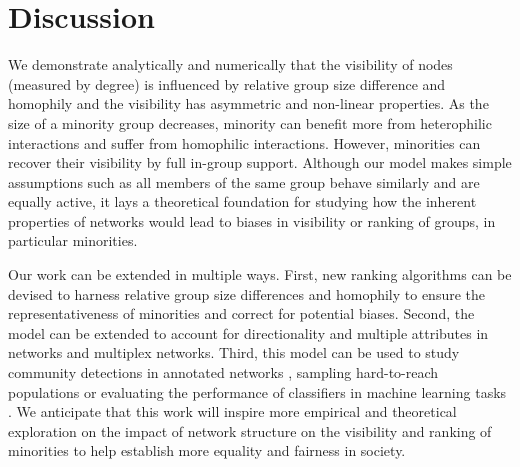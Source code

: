 \section{Discussion}



We demonstrate analytically and numerically that the visibility of nodes (measured by degree) is influenced by relative group size difference and homophily and the visibility has asymmetric and non-linear properties. As the size of a minority group decreases, minority can benefit more from heterophilic interactions and suffer from homophilic interactions. However, minorities can recover their visibility by full in-group support. Although our model makes simple assumptions such as all members of the same group behave similarly and are equally active, it lays a theoretical foundation for studying how the inherent properties of networks would lead to biases in visibility or ranking of groups, in particular minorities. %

Our work can be extended in multiple ways. First, new ranking algorithms can be devised to harness relative group size differences and homophily to ensure the representativeness of minorities and correct for potential biases. Second, the model can be extended to account for directionality and multiple attributes in networks and multiplex networks. Third, this model can be used to study community detections in annotated networks \cite{newman2016structure}, sampling hard-to-reach populations \cite{shaghaghi2011approaches} or evaluating the performance of classifiers in machine learning tasks \cite{hardt2016equality,dwork2012fairness}. We anticipate that this work will inspire more empirical and theoretical exploration on the impact of network structure on the visibility and ranking of minorities to help establish more equality and fairness in society. 








